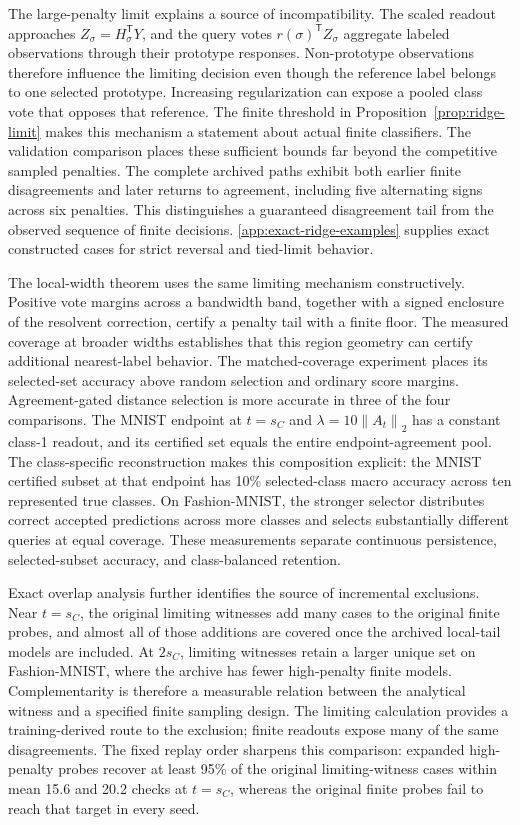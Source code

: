 \documentclass[preprint,12pt,authoryear]{elsarticle}
\newcommand{\norm}[1]{\left\lVert#1\right\rVert}
\newcommand{\tr}{\mathsf{T}}
\begin{document}
The large-penalty limit explains a source of incompatibility. The scaled readout approaches $Z_\sigma=H_\sigma^\tr Y$, and the query votes $r(\sigma)^\tr Z_\sigma$ aggregate labeled observations through their prototype responses. Non-prototype observations therefore influence the limiting decision even though the reference label belongs to one selected prototype. Increasing regularization can expose a pooled class vote that opposes that reference. The finite threshold in Proposition~\ref{prop:ridge-limit} makes this mechanism a statement about actual finite classifiers. The validation comparison places these sufficient bounds far beyond the competitive sampled penalties. The complete archived paths exhibit both earlier finite disagreements and later returns to agreement, including five alternating signs across six penalties. This distinguishes a guaranteed disagreement tail from the observed sequence of finite decisions. \ref{app:exact-ridge-examples} supplies exact constructed cases for strict reversal and tied-limit behavior.

The local-width theorem uses the same limiting mechanism constructively. Positive vote margins across a bandwidth band, together with a signed enclosure of the resolvent correction, certify a penalty tail with a finite floor. The measured coverage at broader widths establishes that this region geometry can certify additional nearest-label behavior. The matched-coverage experiment places its selected-set accuracy above random selection and ordinary score margins. Agreement-gated distance selection is more accurate in three of the four comparisons. The MNIST endpoint at $t=s_C$ and $\lambda=10\norm{A_t}_2$ has a constant class-1 readout, and its certified set equals the entire endpoint-agreement pool. The class-specific reconstruction makes this composition explicit: the MNIST certified subset at that endpoint has 10\% selected-class macro accuracy across ten represented true classes. On Fashion-MNIST, the stronger selector distributes correct accepted predictions across more classes and selects substantially different queries at equal coverage. These measurements separate continuous persistence, selected-subset accuracy, and class-balanced retention.

Exact overlap analysis further identifies the source of incremental exclusions. Near $t=s_C$, the original limiting witnesses add many cases to the original finite probes, and almost all of those additions are covered once the archived local-tail models are included. At $2s_C$, limiting witnesses retain a larger unique set on Fashion-MNIST, where the archive has fewer high-penalty finite models. Complementarity is therefore a measurable relation between the analytical witness and a specified finite sampling design. The limiting calculation provides a training-derived route to the exclusion; finite readouts expose many of the same disagreements. The fixed replay order sharpens this comparison: expanded high-penalty probes recover at least 95\% of the original limiting-witness cases within mean 15.6 and 20.2 checks at $t=s_C$, whereas the original finite probes fail to reach that target in every seed.
\end{document}
